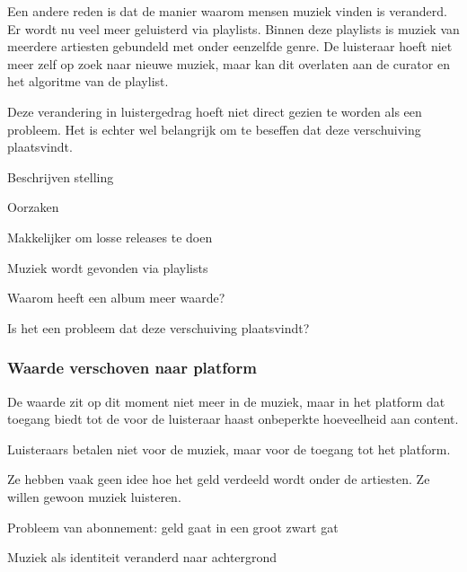 Een andere reden is dat de manier waarom mensen muziek vinden is veranderd. Er wordt nu veel meer geluisterd via playlists. Binnen deze playlists is muziek van meerdere artiesten gebundeld met onder eenzelfde genre. De luisteraar hoeft niet meer zelf op zoek naar nieuwe muziek, maar kan dit overlaten aan de curator en het algoritme van de playlist.

Deze verandering in luistergedrag hoeft niet direct gezien te worden als een probleem. Het is echter wel belangrijk om te beseffen dat deze verschuiving plaatsvindt. 

\begin{todolist}
  \item[\done] Beschrijven stelling
  \item[\done] Oorzaken
  \begin{todolist}
    \item[\done] Makkelijker om losse releases te doen
    \item[\done] Muziek wordt gevonden via playlists
  \end{todolist}
  \item Waarom heeft een album meer waarde?
  \item Is het een probleem dat deze verschuiving plaatsvindt?
\end{todolist}

\subsubsection*{Waarde verschoven naar platform}
\begin{quotebox}
De waarde zit op dit moment niet meer in de muziek, maar in het platform dat toegang biedt tot de voor de luisteraar haast onbeperkte hoeveelheid aan content.
\end{quotebox}
\begin{todolist}
  \item Luisteraars betalen niet voor de muziek, maar voor de toegang tot het platform.
  \item Ze hebben vaak geen idee hoe het geld verdeeld wordt onder de artiesten. Ze willen gewoon muziek luisteren.
  \item Probleem van abonnement: geld gaat in een groot zwart gat
  \item Muziek als identiteit veranderd naar achtergrond
\end{todolist}

